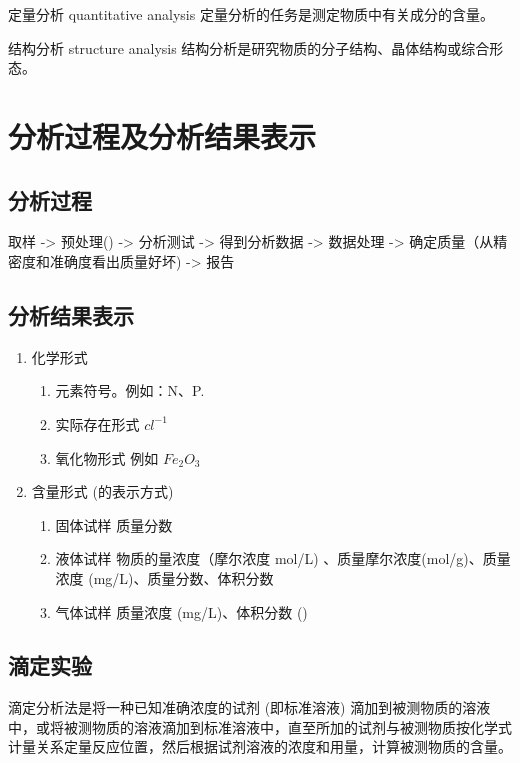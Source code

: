 \begin{definition}{定量分析 quantitative analysis}
	定量分析的任务是测定物质中有关成分的含量。
	
\end{definition}

\begin{definition}{结构分析 structure analysis}
	结构分析是研究物质的分子结构、晶体结构或综合形态。
	
\end{definition}


\section{分析过程及分析结果表示}
\subsection{分析过程}
取样 -> 预处理() -> 分析测试 -> 得到分析数据 -> 数据处理 -> 确定质量（从精密度和准确度看出质量好坏) -> 报告

\subsection{分析结果表示}
\begin{enumerate}
	\item 化学形式
	\begin{enumerate}
		\item 元素符号。例如：N、P.
		\item 实际存在形式 $cl^{-1}$
		\item 氧化物形式 例如 $Fe_2O_3$ 
		
	\end{enumerate}

	\item 含量形式 (的表示方式)
	\begin{enumerate}
		\item 固体试样 质量分数
		\item 液体试样 物质的量浓度（摩尔浓度 mol/L) 、质量摩尔浓度(mol/g)、质量浓度 (mg/L)、质量分数、体积分数
		\item 气体试样 质量浓度 (mg/L)、体积分数 ()
		
	\end{enumerate}
	
\end{enumerate}

\subsection{滴定实验}
滴定分析法是将一种已知准确浓度的试剂 (即标准溶液) 滴加到被测物质的溶液中，或将被测物质的溶液滴加到标准溶液中，直至所加的试剂与被测物质按化学式计量关系定量反应位置，然后根据试剂溶液的浓度和用量，计算被测物质的含量。


